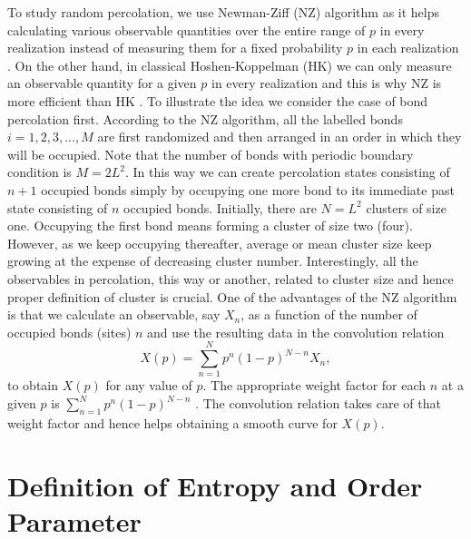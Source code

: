 \documentclass[twocolumn,showpacs,preprintnumbers,amsmath,amssymb]{article}
\begin{document}
To study random percolation, we use Newman-Ziff (NZ) algorithm as 
it helps calculating various observable quantities over the entire range of $p$ in every 
realization instead of measuring them for a fixed probability $p$ in each realization \cite{ref.Ziff}.
On the other hand, in classical Hoshen-Koppelman (HK) we can only measure an observable quantity
for a given $p$ in every realization and this is why NZ is more efficient than HK \cite{ref.hoshen}.
To illustrate the idea we consider the case of bond percolation first. 
According to the NZ algorithm, all the labelled bonds $i=1,2,3,..., M$ 
are first randomized and then arranged in an order 
in which they will be occupied. Note that the number of bonds with periodic
boundary condition is $M=2L^2$. In this way we 
can create percolation states consisting of $n+1$ occupied bonds
simply by occupying one more bond to its immediate past state consisting of $n$ occupied 
bonds. Initially, there are $N=L^2$ clusters of size one.
Occupying the first bond  means forming a cluster of size two (four). However, 
as we keep occupying thereafter, average or mean cluster size keep growing 
at the expense of decreasing cluster number. Interestingly, all the observables in percolation, this
way or another, related to cluster size and hence proper definition of cluster is crucial.
One of the advantages of the NZ algorithm is that we calculate an observable, say $X_n$, as 
a function of the number of occupied bonds (sites) $n$ and use the resulting data in the convolution relation
\begin{equation}
\label{eq:convolution}
X(p)=\sum_{n=1}^N p^n(1-p)^{N-n} X_n,
\end{equation}
to obtain $X(p)$ for any value of $p$. 
The appropriate weight factor for each $n$ at a given $p$ is $\sum_{n=1}^N p^n(1-p)^{N-n}$ \cite{ref.Ziff}. 
The convolution relation takes care of that weight factor and hence helps obtaining a smooth curve for $X(p)$.  





\section{Definition of Entropy and Order Parameter}
\end{document}
